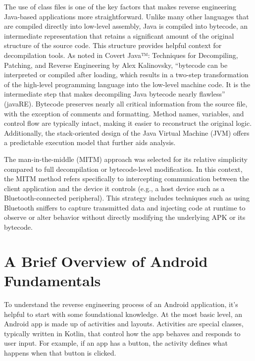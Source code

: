 The use of class files is one of the key factors that makes reverse engineering Java-based applications more straightforward. Unlike many other languages that are compiled directly into low-level assembly, Java is compiled into bytecode, an intermediate representation that retains a significant amount of the original structure of the source code. This structure provides helpful context for decompilation tools.
As noted in Covert Java™: Techniques for Decompiling, Patching, and Reverse Engineering by Alex Kalinovsky, “bytecode can be interpreted or compiled after loading, which results in a two-step transformation of the high-level programming language into the low-level machine code. It is the intermediate step that makes decompiling Java bytecode nearly flawless” (javaRE). Bytecode preserves nearly all critical information from the source file, with the exception of comments and formatting. Method names, variables, and control flow are typically intact, making it easier to reconstruct the original logic. Additionally, the stack-oriented design of the Java Virtual Machine (JVM) offers a predictable execution model that further aids analysis.

The man-in-the-middle (MITM) approach was selected for its relative simplicity compared to full decompilation or bytecode-level modification. In this context, the MITM method refers specifically to intercepting communication between the client application and the device it controls (e.g., a host device such as a Bluetooth-connected peripheral). This strategy includes techniques such as using Bluetooth sniffers to capture transmitted data and injecting code at runtime to observe or alter behavior without directly modifying the underlying APK or its bytecode.

\section {A Brief Overview of Android Fundamentals}
To understand the reverse engineering process of an Android application, it’s helpful to start with some foundational knowledge. At the most basic level, an Android app is made up of activities and layouts. Activities are special classes, typically written in Kotlin, that control how the app behaves and responds to user input. For example, if an app has a button, the activity defines what happens when that button is clicked. 

